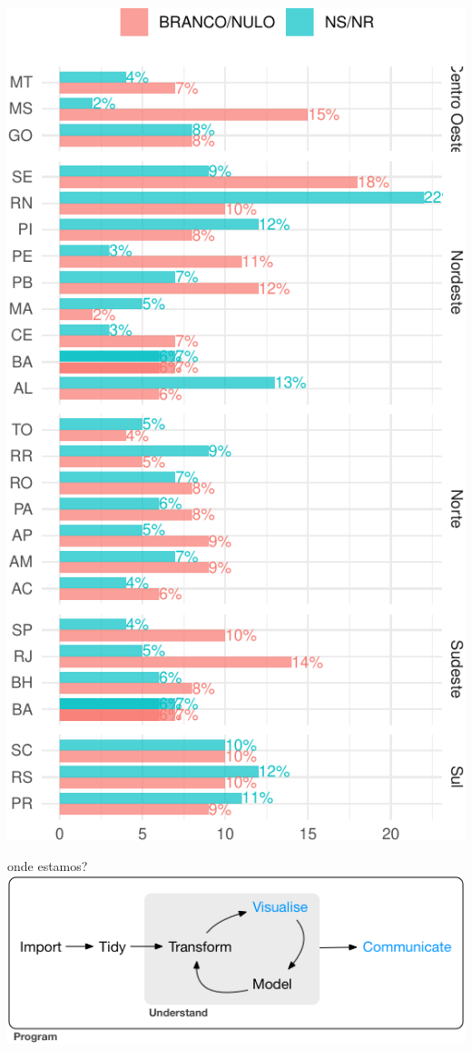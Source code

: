 \documentclass[
  9pt,
  ignorenonframetext,
]{beamer}
\begin{document}
\begin{frame}{}
\protect\hypertarget{section}{}
\includegraphics{aula_07_files/figure-beamer/unnamed-chunk-3-1.pdf}
\end{frame}

\begin{frame}{onde estamos?}
\protect\hypertarget{onde-estamos}{}
\includegraphics{imgs/data-science-communicate.png}
\end{frame}
\end{document}
